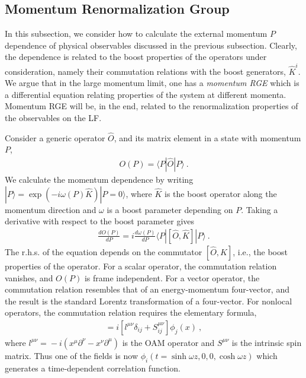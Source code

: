 \documentclass[aps,rmp,reprint,amsmath,amssymb,graphicx,longbibliography]{revtex4-1} %
\begin{document}
\subsection{Momentum Renormalization Group}
\label{sec:lamet-rg}
In this subsection, we consider how to calculate the external momentum $P$
dependence of physical observables discussed in
the previous subsection.
Clearly, the dependence is related to the boost properties of
the operators under consideration, namely their commutation relations
with the boost generators, {$\hat{K}^i$}.
We argue that in the large momentum limit, one
has a {\it momentum RGE} which
is a differential equation relating
properties of the system at different momenta.
Momentum RGE will be, in the end, related to
the renormalization properties of the observables on
the LF.

Consider a generic operator $\hat O$, and its
matrix element in a state with momentum $P$,
\begin{align}
	O(P) = \langle P|\hat O|P\rangle \ .
\end{align}
We calculate the momentum dependence by writing $|P\rangle
= \exp(-i\omega(P) \hat K)|P=0\rangle$, where $\hat K$ is
the boost operator along the momentum direction and $\omega$ is
a boost parameter depending on $P$.
Taking a derivative with respect to the {boost} parameter gives
\begin{align}
	\frac{d O(P)}{dP} = i\frac{d\omega(P)}{dP}\langle P|[\hat O,\hat K]|P\rangle \ .
	\label{eq:momden}
\end{align}
The {r.h.s.} of the equation depends on the commutator
$[\hat O,\hat K]$, i.e., the boost properties of the operator.
For a scalar operator, the commutation relation vanishes, and $O(P)$
is frame independent.
For a vector operator, the commutation relation resembles that of an energy-momentum four-vector,
and the result is the standard Lorentz transformation of a four-vector.
For nonlocal operators, the commutation
relation requires the elementary formula,
\begin{align}
	[J^{\mu\nu}, \phi_i(x)] = i\left[l^{\mu\nu}\delta_{ij}+S^{\mu\nu}_{ij}\right]\phi_j(x)\ ,
\end{align}
where $l^{\mu\nu}\!=\!-i (x^{\mu}\partial^{\nu}\!-\!x^{\nu}\partial^{\mu})$ is the OAM operator and $S^{\mu\nu}$ is the intrinsic spin matrix.
Thus one of the fields is now { $\phi_i(t=\sinh\omega z, 0, 0, \cosh\omega z)$}
which generates a time-dependent correlation function.
\end{document}
